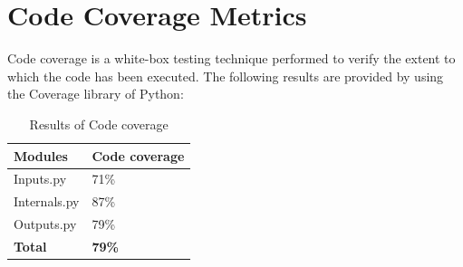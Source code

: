 \documentclass[12pt, titlepage]{article}
\begin{document}
\section{Code Coverage Metrics}
Code coverage is a white-box testing technique performed to verify the extent to which the code has been executed. The following results are provided by using the Coverage library of Python:
\begin{table}[h!]
	\centering
	\begin{tabular}{l l} 
		\toprule		
		\textbf{Modules} & \textbf{Code coverage}\\
		\midrule 
		Inputs.py & 71\% \\
		Internals.py & 87\% \\
		 Outputs.py & 79\% \\
   \hline
   \textbf{Total} & \textbf{79\%}\\
		
		\bottomrule
	\end{tabular}\\
	
	\caption{Results of Code coverage } 
	\label{Tblcodecov}
\end{table}	




\newpage{}
\end{document}
